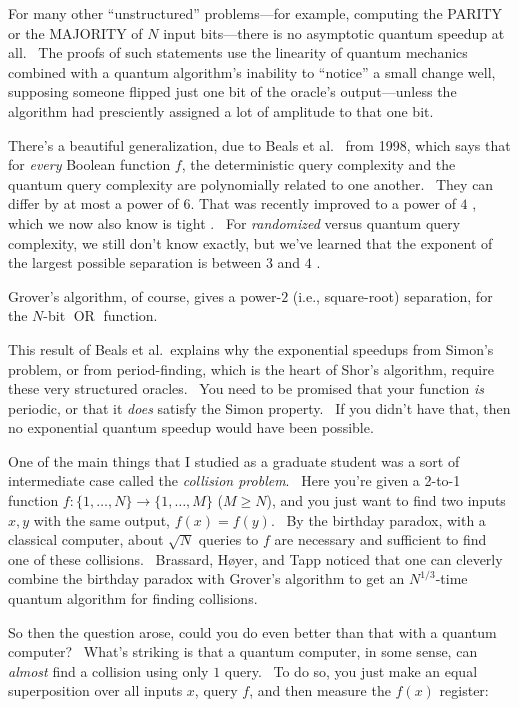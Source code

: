 \documentclass[12pt]{article}
\begin{document}
For many other ``unstructured'' problems---for example, computing the PARITY or the MAJORITY of $N$ input bits---there is no asymptotic quantum speedup at all. \ The proofs of such statements use the linearity of quantum mechanics combined with a quantum algorithm's inability to ``notice'' a small change well, supposing someone flipped just one bit of the oracle's output---unless the algorithm had presciently assigned a lot of amplitude to that one bit.

There's a beautiful generalization, due to Beals et al.\ \cite{bbcmw} from 1998, which says that for \emph{every} Boolean function $f$, the deterministic query complexity and the quantum query complexity are polynomially related to one another. \ They can differ by at most a power of $6$.  That was recently improved to a power of $4$ \cite{abkrt}, which we now also know is tight \cite{abblss}. \ For \emph{randomized} versus quantum query complexity, we still don't know exactly, but we've learned that the exponent of the largest possible separation is between $3$ and $4$ \cite{bansalsinha,sherstovsw}.

Grover's algorithm, of course, gives a power-$2$ (i.e., square-root) separation, for the $N$-bit $\operatorname{OR}$ function.

This result of Beals et al.\ explains why the exponential speedups from Simon's problem, or from period-finding, which is the heart of Shor's algorithm, require these very structured oracles. \ You need to be promised that your function \emph{is} periodic, or that it \emph{does} satisfy the Simon property. \ If you didn't have that, then no exponential quantum speedup would have been possible.

One of the main things that I studied as a graduate student was a sort of intermediate case called the \emph{collision problem}. \ Here you're given a 2-to-1 function $f:\{1,\ldots,N\}\rightarrow \{1,\ldots,M\}$ ($M\ge N$), and you just want to find two inputs $x,y$ with the same output, $f(x)=f(y)$. \ By the birthday paradox, with a classical computer, about $\sqrt{N}$ queries to $f$ are necessary and sufficient to find one of these collisions. \ Brassard, H{\o}yer, and Tapp \cite{bht} noticed that one can cleverly combine the birthday paradox with Grover's algorithm to get an $N^{1/3}$-time quantum algorithm for finding collisions.

So then the question arose, could you do even better than that with a quantum computer? \ What's striking is that a quantum computer, in some sense, can \emph{almost} find a collision using only $1$ query. \ To do so, you just make an equal superposition over all inputs $x$, query $f$, and then measure the $f(x)$ register:
\end{document}
